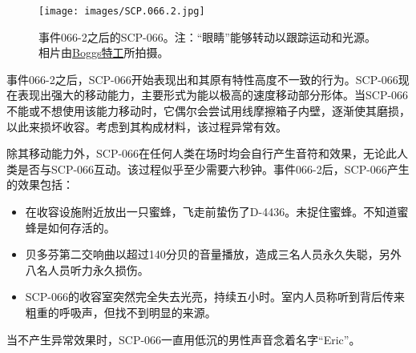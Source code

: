 \begin{figure}[H]
    \centering
    \texttt{[image: images/SCP.066.2.jpg]}
    \caption*{事件066-2之后的SCP-066。注：“眼睛”能够转动以跟踪运动和光源。 相片由\href{http://www.insubordiknit.com/}{Boggs特工}所拍摄。}
\end{figure}

事件066-2之后，SCP-066开始表现出和其原有特性高度不一致的行为。SCP-066现在表现出强大的移动能力，主要形式为能以极高的速度移动部分形体。当SCP-066不能或不想使用该能力移动时，它偶尔会尝试用线摩擦箱子内壁，逐渐使其磨损，以此来损坏收容。考虑到其构成材料，该过程异常有效。

除其移动能力外，SCP-066在任何人类在场时均会自行产生音符和效果，无论此人类是否与SCP-066互动。该过程似乎至少需要六秒钟。事件066-2后，SCP-066产生的效果包括：

\begin{itemize}
\item 在收容设施附近放出一只蜜蜂，飞走前蛰伤了D-4436。未捉住蜜蜂。不知道蜜蜂是如何存活的。
\item 贝多芬第二交响曲以超过140分贝的音量播放，造成三名人员永久失聪，另外八名人员听力永久损伤。
\item SCP-066的收容室突然完全失去光亮，持续五小时。室内人员称听到背后传来粗重的呼吸声，但找不到明显的来源。
\end{itemize}

当不产生异常效果时，SCP-066一直用低沉的男性声音念着名字“Eric”。

